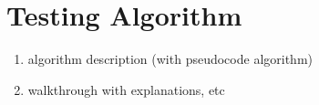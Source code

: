 \section{Testing Algorithm}

\begin{enumerate}
	\item algorithm description (with pseudocode algorithm)
	\item walkthrough with explanations, etc
\end{enumerate}